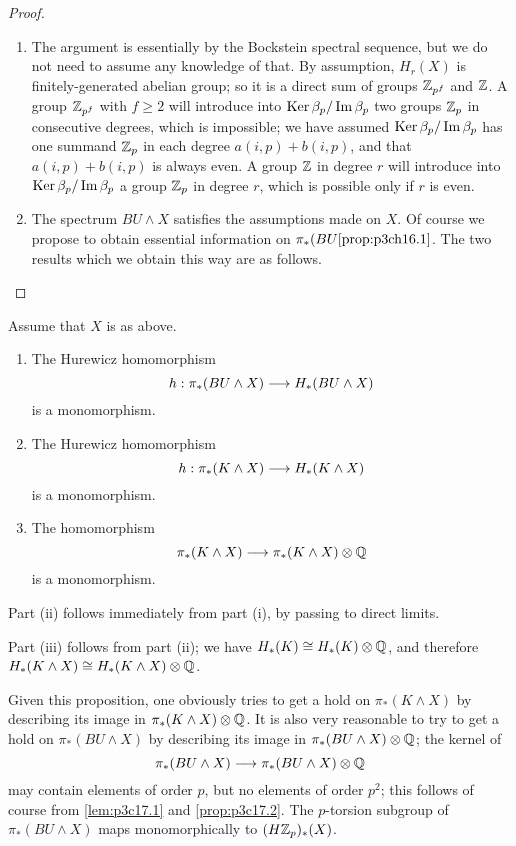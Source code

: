 \documentclass[../main]{subfiles}
\begin{document}
\begin{proof}
    \begin{enumerate}
        \item The argument is essentially by the Bockstein spectral sequence, but we do not need to assume any knowledge of that. By assumption, $H_r(X)$ is finitely-generated abelian group; so it is a direct sum of groups $\mathbb{Z}_{p^f}$ and $\mathbb{Z}$. A group $\mathbb{Z}_{p^f}$ with $f\ge2$ will introduce into $\operatorname{\mathop{\mathrm{Ker}}}\beta_p / \mathop{\mathrm{Im}}\beta_p$ two groups $\mathbb{Z}_p$ in consecutive degrees, which is impossible; we have assumed $\operatorname{\mathop{\mathrm{Ker}}}\beta_p / \mathop{\mathrm{Im}}\beta_p$ has one summand $\mathbb{Z}_p$ in each degree $a(i,p) + b(i,p)$, and that $a(i,p) + b(i,p)$ is always even. A group $\mathbb{Z}$ in degree $r$ will introduce into $\operatorname{\mathop{\mathrm{Ker}}}\beta_p / \mathop{\mathrm{Im}}\beta_p$ a group $\mathbb{Z}_p$ in degree $r$, which is possible only if $r$ is even.
        \item The spectrum ${BU}\wedge X$ satisfies the assumptions made on $X$. Of course we propose to obtain essential information on $\pi_*({BU}\ref{prop:p3ch16.1}$. The two results which we obtain this way are as follows.
    \end{enumerate}
\end{proof}
\begin{proposition} \label{prop:p3c17.2} Assume that $X$ is as above.
    \begin{enumerate}
        \item The Hurewicz homomorphism
        \[
        h : \pi_*({BU}\wedge X) \longrightarrow{} H_*({BU}\wedge X)
        \]
        is a monomorphism.
        \item The Hurewicz homomorphism
        \[
        h : \pi_*(K\wedge X) \longrightarrow{} H_*(K\wedge X)
        \]
        is a monomorphism.
        \item The homomorphism
        \[
        \pi_*(K\wedge X) \longrightarrow{} \pi_*(K\wedge X)\otimes\mathbb{Q}
        \]
        is a monomorphism.
    \end{enumerate}
\end{proposition}
Part (ii) follows immediately from part (i), by passing to direct
limits.

Part (iii) follows from part (ii); we have $H_*(K)\cong H_*(K)\otimes\mathbb{Q}$, and therefore $H_*(K\wedge X)\cong H_*(K\wedge X)\otimes\mathbb{Q}$.

Given this proposition, one obviously tries to get a hold on $\pi_*(K\wedge X)$ by describing its image in $\pi_*(K\wedge X)\otimes\mathbb{Q}$. It is also very reasonable to try to get a hold on $\pi_*({BU}\wedge X)$ by describing its image in $\pi_*({BU}\wedge X)\otimes\mathbb{Q}$; the
kernel of
\[
\pi_*({BU}\wedge X) \longrightarrow{} \pi_*({BU}\wedge X)\otimes\mathbb{Q}
\]
may contain elements of order $p$, but no elements of order $p^2$; this follows of course from \ref{lem:p3c17.1} and \ref{prop:p3c17.2}. The $p$-torsion subgroup of $\pi_*({BU}\wedge X)$ maps monomorphically to $(H\mathbb{Z}_p)_*(X)$.
\end{document}
